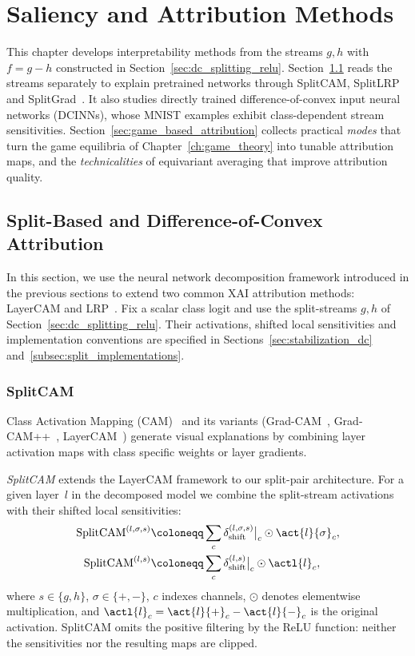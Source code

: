 \chapter{Saliency and Attribution Methods}\label{ch:saliency}

This chapter develops interpretability methods from the streams $g,h$ with $f=g-h$ constructed in Section~\ref{sec:dc_splitting_relu}. Section~\ref{sec:split_attribution_concept} reads the streams separately to explain pretrained networks through SplitCAM, SplitLRP and SplitGrad~\parencite{hiddenMono}. It also studies directly trained difference-of-convex input neural networks (DCINNs), whose MNIST examples exhibit class-dependent stream sensitivities. Section~\ref{sec:game_based_attribution} collects practical \emph{modes} that turn the game equilibria of Chapter~\ref{ch:game_theory} into tunable attribution maps, and the \emph{technicalities} of equivariant averaging that improve attribution quality.

\section{Split-Based and Difference-of-Convex Attribution}\label{sec:split_attribution_concept}

In this section, we use the neural network decomposition framework introduced in the previous sections to extend two common XAI attribution methods: LayerCAM and LRP~\parencite{hiddenMono}. Fix a scalar class logit and use the split-streams $g,h$ of Section~\ref{sec:dc_splitting_relu}. Their activations, shifted local sensitivities and implementation conventions are specified in Sections~\ref{sec:stabilization_dc} and~\ref{subsec:split_implementations}.

\subsection{SplitCAM}\label{sec:split_cam}

Class Activation Mapping (CAM)~\parencite{Zhou2016} and its variants (Grad-CAM~\parencite{Selvaraju2017}, Grad-CAM++~\parencite{Chattopadhay2018}, LayerCAM~\parencite{Jiang2021LayerCAM}) generate visual explanations by combining layer activation maps with class specific weights or layer gradients.

\emph{SplitCAM} extends the LayerCAM framework to our split-pair architecture. For a given layer~$l$ in the decomposed model we combine the split-stream activations with their shifted local sensitivities:
\begin{align}
\text{SplitCAM}^{(l,\sigma,s)} &\coloneqq \sum_c \delta_{\mathrm{shift}}^{(l,\sigma,s)}\big\vert_c\odot\act{l}{\sigma}_c,
\label{eq:splitcam_stream}\\
\text{SplitCAM}^{(l,s)} &\coloneqq \sum_c \delta_{\mathrm{shift}}^{(l,s)}\big\vert_c\odot\actl{l}_c,
\label{eq:splitcam_combined}
\end{align}
where $s\in\{g,h\}$, $\sigma\in\{+,-\}$, $c$ indexes channels, $\odot$ denotes elementwise multiplication, and $\actl{l}_c=\act{l}{+}_c-\act{l}{-}_c$ is the original activation. SplitCAM omits the positive filtering by the ReLU function: neither the sensitivities nor the resulting maps are clipped.

